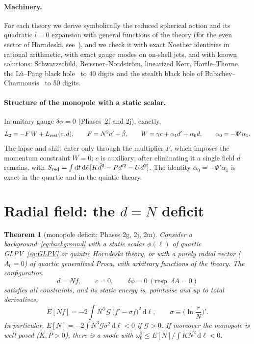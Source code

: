 \documentclass[11pt,a4paper]{article}
\newtheorem{theorem}{Theorem}
\theoremstyle{remark}
\newcommand{\G}{\mathcal G}
\newcommand{\dd}{\mathrm d}
\begin{document}
\paragraph{Machinery.} For each theory we derive symbolically the reduced spherical action and its quadratic $l=0$ expansion with general functions of the theory (for the even sector of Horndeski, see~\cite{KMS2}), and we check it with exact Noether identities in rational arithmetic, with exact gauge modes on on-shell jets, and with known solutions: Schwarzschild, Reissner--Nordström, linearized Kerr, Hartle--Thorne, the Lü--Pang black hole~\cite{LuPang} to 40 digits and the stealth black hole of Babichev--Charmousis~\cite{BabichevCharmousis} to 50 digits.

\paragraph{Structure of the monopole with a static scalar.} In unitary gauge $\delta\phi=0$ (Phases~2f and 2j), exactly,
\begin{equation}
L_2=-F\,W+L_{\rm rest}(c,d),\qquad F=N^2a'+\dot\beta,\qquad W=\gamma c+\alpha_1d'+\alpha_0d,\qquad \alpha_0=-\Phi'\alpha_1 .
\label{eq:structure}
\end{equation}
The lapse and shift enter only through the multiplier $F$, which imposes the momentum constraint $W=0$; $c$ is auxiliary; after eliminating it a single field $d$ remains, with $S_{\rm red}=\int\dd t\,\dd\ell\,[K\dot d^2-Pd'^2-Ud^2]$. The identity $\alpha_0=-\Phi'\alpha_1$ is exact in the quartic and in the quintic theory.

\section{Radial field: the $d=N$ deficit}\label{sec:radial}

\begin{theorem}[monopole deficit; Phases 2g, 2j, 2m]\label{thm:dN}
Consider a background~\eqref{eq:background} with a static scalar $\phi(\ell)$ of quartic GLPV~\eqref{eq:GLPV} or quintic Horndeski theory, or with a purely radial vector ($A_0=0$) of quartic generalized Proca, with arbitrary functions of the theory. The configuration
\begin{equation}
d=N f,\qquad c=0,\qquad \delta\phi=0\ (\text{resp. }\delta A=0)
\end{equation}
satisfies all constraints, and its static energy is, pointwise and up to total derivatives,
\begin{equation}
E[Nf]=-2\int N^3\,\G\,\big(f'-\sigma f\big)^2\,\dd\ell,\qquad \sigma\equiv\Big(\ln\frac rN\Big)' .
\label{eq:EN}
\end{equation}
In particular, $E[N]=-2\int N^3\G\sigma^2\,\dd\ell<0$ if $\G>0$. If moreover the monopole is well posed ($K,P>0$), there is a mode with $\omega_0^2\le E[N]/\int KN^2\,\dd\ell<0$.
\end{theorem}
\end{document}
